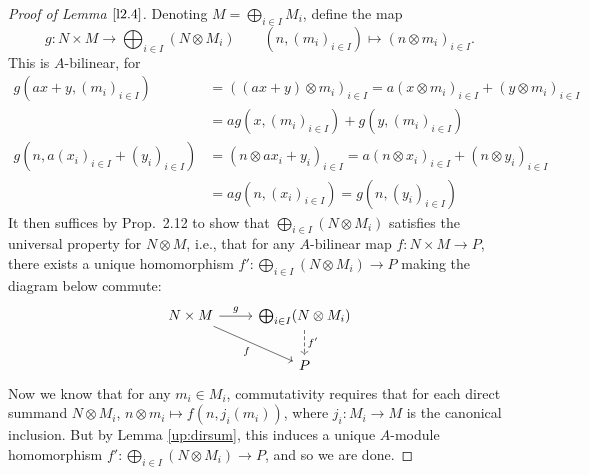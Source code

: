\documentclass[12pt,letterpaper]{article}
\theoremstyle{definition}
\theoremstyle{remark}
\numberwithin{figure}{problem}
\numberwithin{equation}{section}
\begin{document}
\begin{proof}[Proof of Lemma
  $\ref{l2.4}$]
  Denoting
  $M = \bigoplus_{i \in
    I}M_i$, define the map
  \begin{equation*}
    g \colon N \times M \to \bigoplus_{i \in I}(N \otimes M_i) \qquad (n,(m_i)_{i\in I}) \mapsto (n \otimes m_i)_{i \in I}.
  \end{equation*}
  This is
  $A$-bilinear, for
  \begin{align*}
    g(ax+y,(m_i)_{i\in I}) &%
    = ((ax+y) \otimes m_i)_{i \in I} = a(x \otimes m_i)_{i \in I} + (y \otimes m_i)_{i \in I}\\
    &%
    = ag(x,(m_i)_{i\in I}) + g(y,(m_i)_{i\in I})\\
    g(n,a(x_i)_{i\in I}+(y_i)_{i\in I}) &%
    = (n \otimes ax_i+y_i)_{i\in I} = a(n \otimes x_i)_{i \in I} + (n \otimes y_i)_{i \in I}\\
    &%
    = ag(n,(x_i)_{i\in I}) = g(n,(y_i)_{i\in I})
  \end{align*}
  It then suffices by Prop.~2.12 to show that
  $\bigoplus_{i \in I}(N \otimes
  M_i)$ satisfies the universal property for
  $N \otimes
  M$, i.e., that for any
  $A$-bilinear map
  $f\colon N \times M \to
  P$, there exists a unique homomorphism
  $f'\colon \bigoplus_{i \in I}(N \otimes M_i) \to
  P$ making the diagram below commute:
  \begin{equation*}
    \begin{tikzcd}
      N \times M \rar{g}\arrow{dr}[swap]{f} &
      \bigoplus_{i \in I}(N \otimes M_i)\dar[dashed]{f'}\\
      &
      P
    \end{tikzcd}
  \end{equation*}
  Now we know that for any
  $m_i \in
  M_i$, commutativity requires that for each direct summand
  $N \otimes
  M_i$,
  $n \otimes m_i \mapsto
  f(n,j_i(m_i))$, where
  $j_i \colon M_i \to
  M$ is the canonical inclusion.
  But by Lemma \ref{up:dirsum}, this induces a unique
  $A$-module homomorphism
  $f' \colon \bigoplus_{i \in I}(N \otimes M_i) \to
  P$, and so we are done.
\end{proof}
\end{document}
